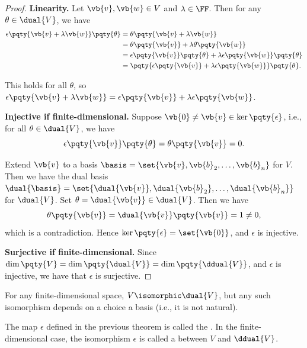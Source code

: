 \begin{proof}
    \textbf{Linearity.} Let \(\vb{v}, \vb{w} \in V\) and \(\lambda \in \FF\). Then for any \(\theta \in \dual{V}\), we have
    \begin{align*}
        \epsilon\pqty{\vb{v} + \lambda \vb{w}}\pqty{\theta} &= \theta\pqty{\vb{v} + \lambda \vb{w}} \\
        &= \theta\pqty{\vb{v}} + \lambda \theta\pqty{\vb{w}} \\
        &= \epsilon\pqty{\vb{v}}\pqty{\theta} + \lambda \epsilon\pqty{\vb{w}}\pqty{\theta} \\
        &= \pqty{\epsilon\pqty{\vb{v}} + \lambda \epsilon\pqty{\vb{w}}}\pqty{\theta}.
    \end{align*}

    This holds for all \(\theta\), so \(\epsilon\pqty{\vb{v} + \lambda \vb{w}} = \epsilon\pqty{\vb{v}} + \lambda \epsilon\pqty{\vb{w}}\).

    \textbf{Injective if finite-dimensional.} Suppose \(\vb{0} \neq \vb{v} \in \ker \pqty{\epsilon}\), i.e., for all \(\theta \in \dual{V}\), we have
    \[
        \epsilon\pqty{\vb{v}}\pqty{\theta} = \theta\pqty{\vb{v}} = 0.
    \]

    Extend \(\vb{v}\) to a basis \(\basis = \set{\vb{v}, \vb{b}_2, \ldots, \vb{b}_n}\) for \(V\). Then we have the dual basis \(\dual{\basis} = \set{\dual{\vb{v}}, \dual{\vb{b}_2}, \ldots, \dual{\vb{b}_n}}\) for \(\dual{V}\). Set \(\theta = \dual{\vb{v}} \in \dual{V}\). Then we have
    \[
        \theta\pqty{\vb{v}} = \dual{\vb{v}}\pqty{\vb{v}} = 1 \neq 0,
    \]
    which is a contradiction. Hence \(\ker\pqty{\epsilon} = \set{\vb{0}}\), and \(\epsilon\) is injective.

    \textbf{Surjective if finite-dimensional.} Since \(\dim\pqty{V} = \dim\pqty{\dual{V}} = \dim\pqty{\ddual{V}}\), and \(\epsilon\) is injective, we have that \(\epsilon\) is surjective.
\end{proof}

\begin{remark}
    For any finite-dimensional space, \(V \isomorphic \dual{V}\), but any such isomorphism depends on a choice a basis (i.e., it is not natural).
\end{remark}

\begin{definition}
    The map \(\epsilon\) defined in the previous theorem is called the . In the finite-dimensional case, the isomorphism \(\epsilon\) is called a  between \(V\) and \(\ddual{V}\).
\end{definition}

